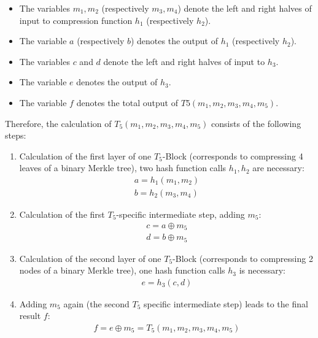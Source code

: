 \begin{itemize}
\item The variables  $m_1, m_2$ (respectively $m_3, m_4$) denote the left and right halves of input to compression function $h_1$ (respectively $h_2$).
\item The variable $a$ (respectively $b$) denotes the output of $h_1$ (respectively $h_2$).
\item The variables $c$ and $d$ denote the left and right halves of input to $h_3$.
\item The variable $e$ denotes the output of $h_3$.
\item The variable $f$ denotes the total output of $T5(m_1, m_2, m_3, m_4, m_5)$.
\end{itemize}
Therefore, the calculation of $T_5(m_1, m_2, m_3, m_4, m_5)$ consists of the following steps:
\begin{enumerate}
\item Calculation of the first layer of one $T_5$-Block (corresponds to compressing 4 leaves of a binary Merkle tree), two hash function calls $h_1, h_2$ are necessary:
\begin{align}
a = h_1(m_1, m_2) \\
b = h_2(m_3, m_4)
\end{align}

\item Calculation of the first $T_5$-specific intermediate step, adding $m_5$:
\begin{align}
c = a \oplus m_5 \\
d = b \oplus m_5
\end{align}

\item Calculation of the second layer of one $T_5$-Block (corresponds to compressing 2 nodes of a binary Merkle tree), one hash function calls $h_3$ is necessary:
\begin{align}
e = h_3(c,d)
\end{align}

\item Adding $m_5$ again (the second $T_5$ specific intermediate step) leads to the final result $f$:
\begin{align}
f = e \oplus m_5 = T_5(m_1, m_2, m_3, m_4, m_5)
\end{align}
\end{enumerate}

